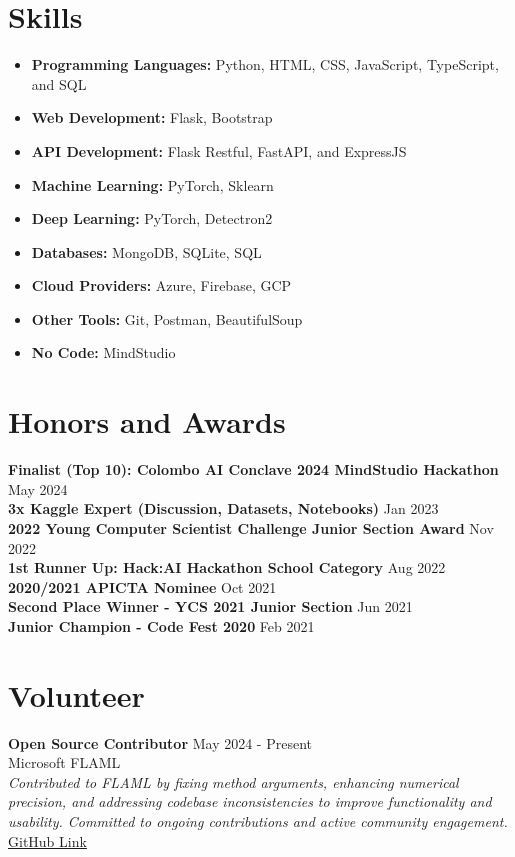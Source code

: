 \documentclass[10pt,letterpaper]{article}
\begin{document}
\section*{Skills}
\begin{itemize}[leftmargin=*,label={\color{darkgray}\textbullet}]
    \item \textbf{Programming Languages:} Python, HTML, CSS, JavaScript, TypeScript, and SQL
    \item \textbf{Web Development:} Flask, Bootstrap
    \item \textbf{API Development:} Flask Restful, FastAPI, and ExpressJS
    \item \textbf{Machine Learning:} PyTorch, Sklearn
    \item \textbf{Deep Learning:} PyTorch, Detectron2
    \item \textbf{Databases:} MongoDB, SQLite, SQL
    \item \textbf{Cloud Providers:} Azure, Firebase, GCP
    \item \textbf{Other Tools:} Git, Postman, BeautifulSoup
    \item \textbf{No Code:} MindStudio
\end{itemize}

\section*{Honors and Awards}
\textbf{Finalist (Top 10): Colombo AI Conclave 2024 MindStudio Hackathon} \hfill May 2024 \\
\textbf{3x Kaggle Expert (Discussion, Datasets, Notebooks)} \hfill Jan 2023 \\
\textbf{2022 Young Computer Scientist Challenge Junior Section Award} \hfill Nov 2022 \\
\textbf{1st Runner Up: Hack:AI Hackathon School Category} \hfill Aug 2022 \\
\textbf{2020/2021 APICTA Nominee} \hfill Oct 2021 \\
\textbf{Second Place Winner - YCS 2021 Junior Section} \hfill Jun 2021 \\
\textbf{Junior Champion - Code Fest 2020} \hfill Feb 2021 \\

\section*{Volunteer}
\textbf{Open Source Contributor} \hfill May 2024 - Present \\
Microsoft FLAML \\
\textit{Contributed to FLAML by fixing method arguments, enhancing numerical precision, and addressing codebase inconsistencies to improve functionality and usability. Committed to ongoing contributions and active community engagement.} \\
\href{https://github.com/Programmer-RD-AI/FLAML}{GitHub Link}
\end{document}
